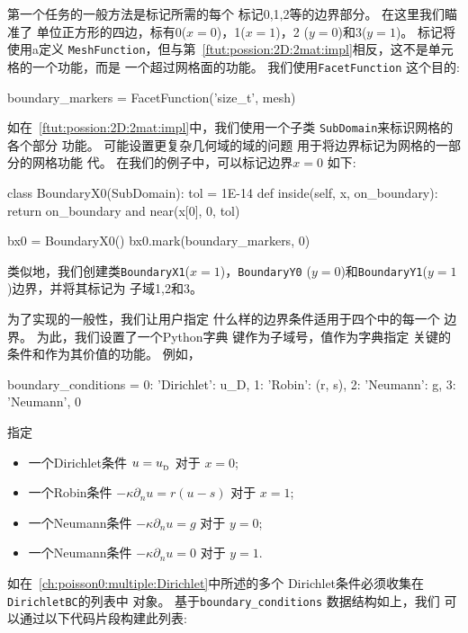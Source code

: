 \noindent
第一个任务的一般方法是标记所需的每个
标记0,1,2等的边界部分。 在这里我们瞄准了
单位正方形的四边，标有0($x = 0$)，1($x = 1$)，2
($y = 0$)和3($y = 1$)。 标记将使用a定义
\texttt{MeshFunction}，但与第~\ref{ftut:possion:2D:2mat:impl}相反，这不是单元格的一个功能，而是
一个超过网格面的功能。 我们使用\texttt{FacetFunction}
这个目的:

\begin{python}
boundary_markers = FacetFunction('size_t', mesh)
\end{python}
如在~\ref{ftut:possion:2D:2mat:impl}中，我们使用一个子类
\texttt{SubDomain}来标识网格的各个部分
功能。 可能设置更复杂几何域的域的问题
用于将边界标记为网格的一部分的网格功能
代。 在我们的例子中，可以标记边界$x = 0$
如下:

\begin{python}
class BoundaryX0(SubDomain):
    tol = 1E-14
    def inside(self, x, on_boundary):
        return on_boundary and near(x[0], 0, tol)

bx0 = BoundaryX0()
bx0.mark(boundary_markers, 0)
\end{python}
类似地，我们创建类\texttt{BoundaryX1}($x = 1$)，\texttt{BoundaryY0}
($y = 0$)和\texttt{BoundaryY1}($y = 1$)边界，并将其标记为
子域1,2和3。

为了实现的一般性，我们让用户指定
什么样的边界条件适用于四个中的每一个
边界。 为此，我们设置了一个Python字典
键作为子域号，值作为字典指定
关键的条件和作为其价值的功能。
例如，

\begin{python}
boundary_conditions = {0: {'Dirichlet': u_D},
                       1: {'Robin':     (r, s)},
                       2: {'Neumann':   g},
                       3: {'Neumann',   0}}
\end{python}
指定

\begin{itemize}
 \item 一个Dirichlet条件 $u = u_{_\mathrm{D}}$ 对于 $x = 0$;

 \item 一个Robin条件 $-\kappa\partial_n u = r(u-s)$ 对于 $x = 1$;

 \item 一个Neumann条件 $-\kappa\partial_n u = g$ 对于 $y = 0$;

 \item 一个Neumann条件 $-\kappa\partial_n u = 0$ 对于 $y = 1$.
\end{itemize}

\noindent
如在~\ref{ch:poisson0:multiple:Dirichlet}中所述的多个
Dirichlet条件必须收集在\texttt{DirichletBC}的列表中
对象。 基于\verb!boundary_conditions! 数据结构如上，我们
可以通过以下代码片段构建此列表:

